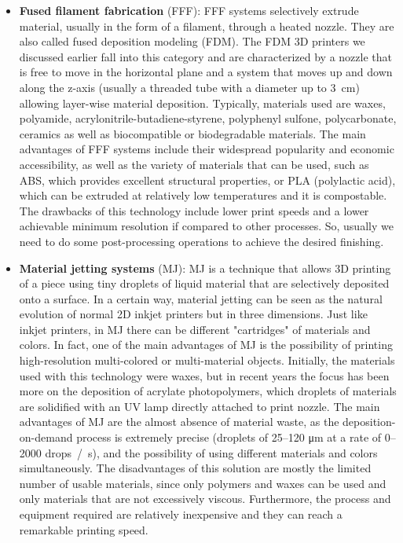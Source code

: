 \begin{itemize}
    \item \textbf{Fused filament fabrication} (FFF): FFF systems selectively extrude material, usually in the form of a filament, through a heated nozzle. They are also called fused deposition modeling (FDM). The FDM 3D printers we discussed earlier fall into this category and are characterized by a nozzle that is free to move in the horizontal plane and a system that moves up and down along the z-axis (usually a threaded tube with a diameter up to \SI{3}{\centi\metre}) allowing layer-wise material deposition. Typically, materials used are waxes, polyamide, acrylonitrile-butadiene-styrene, polyphenyl sulfone, polycarbonate, ceramics as well as biocompatible or biodegradable materials. The main advantages of FFF systems include their widespread popularity and economic accessibility, as well as the variety of materials that can be used, such as ABS, which provides excellent structural properties, or PLA (polylactic acid), which can be extruded at relatively low temperatures and it is compostable. The drawbacks of this technology include lower print speeds and a lower achievable minimum resolution if compared to other processes. So, usually we need to do some post-processing operations to achieve the desired finishing.
    \item \textbf{Material jetting systems} (MJ): MJ is a technique that allows 3D printing of a piece using tiny droplets of liquid material that are selectively deposited onto a surface. In a certain way, material jetting can be seen as the natural evolution of normal 2D inkjet printers but in three dimensions. Just like inkjet printers, in MJ there can be different "cartridges" of materials and colors. In fact, one of the main advantages of MJ is the possibility of printing high-resolution multi-colored or multi-material objects. Initially, the materials used with this technology were waxes, but in recent years the focus has been more on the deposition of acrylate photopolymers, which droplets of materials are solidified with an UV lamp directly attached to print nozzle. The main advantages of MJ are the almost absence of material waste, as the deposition-on-demand process is extremely precise (droplets of \numrange{25}{120} \unit{\micro\meter} at a rate of \numrange{0}{2000} \unit{drops / \second}), and the possibility of using different materials and colors simultaneously. The disadvantages of this solution are mostly the limited number of usable materials, since only polymers and waxes can be used and only materials that are not excessively viscous. Furthermore, the process and equipment required are relatively inexpensive and they can reach a remarkable printing speed.

\end{itemize}
